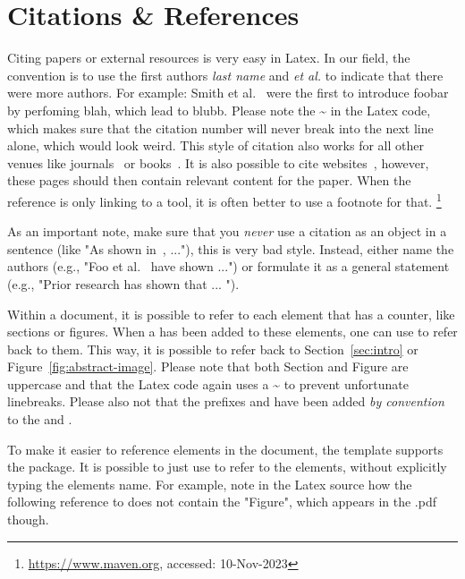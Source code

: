 \section{Citations \& References}

Citing papers or external resources is very easy in Latex.
In our field, the convention is to use the first authors \emph{last name} and \emph{et al.} to indicate that there were more authors. For example: Smith et al.~\cite{AAI34-icse} were the first to introduce foobar by perfoming blah, which lead to blubb.
Please note the {\textasciitilde} in the Latex code, which makes sure that the citation number will never break into the next line alone, which would look weird.
This style of citation also works for all other venues like journals~\cite{DE23-emse} or books~\cite{ABC12-abc}.
It is also possible to cite websites~\cite{Pue08}, however, these pages should then contain relevant content for the paper.
When the reference is only linking to a tool, it is often better to use a footnote for that.%
\footnote{\url{https://www.maven.org}, accessed: 10-Nov-2023}

As an important note, make sure that you \emph{never} use a citation as an object in a sentence (like "As shown in~\cite{DE23-emse}, ..."), this is very bad style.
Instead, either name the authors (e.g., "Foo et al.~\cite{DE23-emse} have shown ...") or formulate it as a general statement (e.g., "Prior research has shown that ... \cite{DE23-emse}").

\medskip
Within a document, it is possible to refer to each element that has a counter, like sections or figures.
When a  has been added to these elements, one can use  to refer back to them.
This way, it is possible to refer back to Section~\ref{sec:intro} or Figure~\ref{fig:abstract-image}.
Please note that both Section and Figure are uppercase and that the Latex code again uses a {\textasciitilde} to prevent unfortunate linebreaks.
Please also not that the prefixes  and  have been added \emph{by convention} to the  and .

To make it easier to reference elements in the document, the template supports the  package.
It is possible to just use  to refer to the elements, without explicitly typing the elements name.
For example, note in the Latex source how the following reference to  does not contain the "Figure", which appears in the .pdf though.

